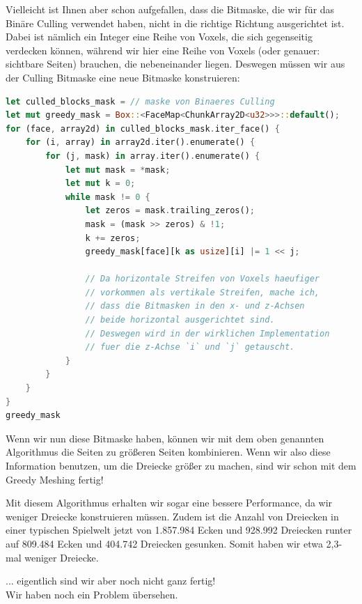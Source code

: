 Vielleicht ist Ihnen aber schon aufgefallen,
dass die Bitmaske, die wir für das Binäre Culling
verwendet haben, nicht in die richtige Richtung
ausgerichtet ist.
Dabei ist nämlich ein Integer eine Reihe von Voxels,
die sich gegenseitig verdecken können, während wir
hier eine Reihe von Voxels
(oder genauer: sichtbare Seiten)
brauchen, die nebeneinander liegen.
Deswegen müssen wir aus der Culling Bitmaske
eine neue Bitmaske konstruieren:

\begin{lstlisting}[language=Rust]
let culled_blocks_mask = // maske von Binaeres Culling
let mut greedy_mask = Box::<FaceMap<ChunkArray2D<u32>>>::default();
for (face, array2d) in culled_blocks_mask.iter_face() {
	for (i, array) in array2d.iter().enumerate() {
		for (j, mask) in array.iter().enumerate() {
			let mut mask = *mask;
			let mut k = 0;
			while mask != 0 {
				let zeros = mask.trailing_zeros();
				mask = (mask >> zeros) & !1;
				k += zeros;
				greedy_mask[face][k as usize][i] |= 1 << j;

				// Da horizontale Streifen von Voxels haeufiger
				// vorkommen als vertikale Streifen, mache ich,
				// dass die Bitmasken in den x- und z-Achsen
				// beide horizontal ausgerichtet sind.
				// Deswegen wird in der wirklichen Implementation
				// fuer die z-Achse `i` und `j` getauscht.
			}
		}
	}
}
greedy_mask
\end{lstlisting}

Wenn wir nun diese Bitmaske haben, können wir mit dem
oben genannten Algorithmus die Seiten zu größeren
Seiten kombinieren.
Wenn wir also diese Information benutzen,
um die Dreiecke größer zu machen, sind wir
schon mit dem Greedy Meshing fertig!

\vspace{0.5cm}


Mit diesem Algorithmus erhalten wir sogar eine bessere
Performance, da wir weniger Dreiecke konstruieren
müssen.
Zudem ist die Anzahl von Dreiecken in einer
typischen Spielwelt jetzt von
1.857.984 Ecken und 928.992 Dreiecken
runter auf 809.484 Ecken und 404.742 Dreiecken
gesunken.
Somit haben wir etwa 2,3-mal weniger Dreiecke.

\vspace{0.7cm}

{
	\setlength{\parindent}{0pt}
	... eigentlich sind wir aber noch nicht ganz fertig!\\
	Wir haben noch ein Problem übersehen.
}
